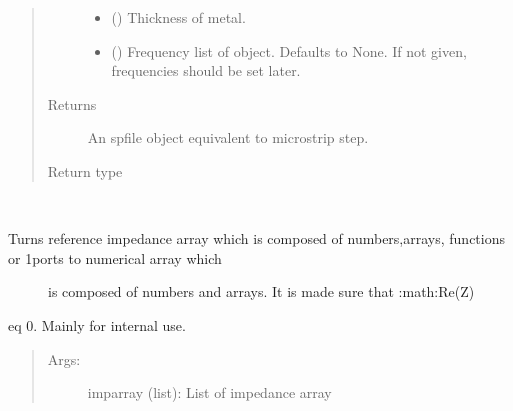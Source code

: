 \documentclass[letterpaper,10pt,english]{sphinxmanual}
\begin{document}
\begin{fulllineitems}
\begin{fulllineitems}
\begin{quote}
\begin{description}
\begin{itemize}
\item {} 
 () \textendash{} Thickness of metal.

\item {} 
 (\sphinxstyleliteralemphasis{\sphinxupquote{, }}) \textendash{} Frequency list of object. Defaults to None. If not given, frequencies should be set later.

\end{itemize}

\item[{Returns}] \leavevmode
An spfile object equivalent to microstrip step.

\item[{Return type}] \leavevmode
{\hyperref[\detokenize{touchstone:touchstone.spfile}]{}}

\end{description}\end{quote}

\end{fulllineitems}


\begin{fulllineitems}
\label{\detokenize{touchstone:touchstone.spfile.prepare_ref_impedance_array}}~\begin{description}
\item[{Turns reference impedance array which is composed of numbers,arrays, functions or 1\sphinxhyphen{}ports to numerical array which}] \leavevmode
is composed of numbers and arrays. It is made sure that :math:{\color{red}\bfseries{}\textasciigrave{}}Re(Z)

\end{description}

eq 0\textasciigrave{}. Mainly for internal use.
\begin{quote}
\begin{description}
\item[{Args:}] \leavevmode
imparray (list): List of impedance array


\end{description}
\end{quote}
\end{fulllineitems}
\end{fulllineitems}
\end{document}
